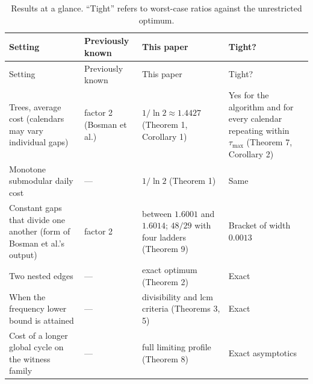 \documentclass[
  british,
  11pt,
  a4paper,
]{article}
\begin{document}
\begin{longtable}[]{@{}
  >{\raggedright\arraybackslash}p{}
  >{\raggedright\arraybackslash}p{}
  >{\raggedright\arraybackslash}p{}
  >{\raggedright\arraybackslash}p{}@{}}
\caption{Results at a glance. ``Tight'' refers to worst-case ratios
against the unrestricted optimum.}\tabularnewline
\toprule\noalign{}
\begin{minipage}[b]{\linewidth}\raggedright
Setting
\end{minipage} & \begin{minipage}[b]{\linewidth}\raggedright
Previously known
\end{minipage} & \begin{minipage}[b]{\linewidth}\raggedright
This paper
\end{minipage} & \begin{minipage}[b]{\linewidth}\raggedright
Tight?
\end{minipage} \\
\midrule\noalign{}
\endfirsthead
\toprule\noalign{}
\begin{minipage}[b]{\linewidth}\raggedright
Setting
\end{minipage} & \begin{minipage}[b]{\linewidth}\raggedright
Previously known
\end{minipage} & \begin{minipage}[b]{\linewidth}\raggedright
This paper
\end{minipage} & \begin{minipage}[b]{\linewidth}\raggedright
Tight?
\end{minipage} \\
\midrule\noalign{}
\endhead
\bottomrule\noalign{}
\endlastfoot
Trees, average cost (calendars may vary individual gaps) & factor 2
(Bosman et al.) & \(1/\ln2\approx1.4427\) (Theorem 1, Corollary 1) & Yes
for the algorithm and for every calendar repeating within
\(\tau_{\max}\) (Theorem 7, Corollary 2) \\
Monotone submodular daily cost & --- & \(1/\ln2\) (Theorem 1) & Same \\
Constant gaps that divide one another (form of Bosman et al.'s output) &
factor 2 & between \(1.6001\) and \(1.6014\); \(48/29\) with four
ladders (Theorem 9) & Bracket of width \(0.0013\) \\
Two nested edges & --- & exact optimum (Theorem 2) & Exact \\
When the frequency lower bound is attained & --- & divisibility and lcm
criteria (Theorems 3, 5) & Exact \\
Cost of a longer global cycle on the witness family & --- & full
limiting profile (Theorem 8) & Exact asymptotics \\
\end{longtable}
\end{document}
